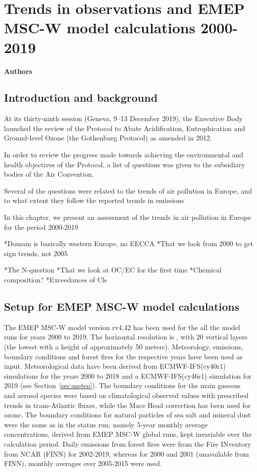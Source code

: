 \chapter[Trends]{Trends in observations and EMEP MSC-W model calculations 2000-2019}
\label{ch:Trends}

{\bf{Authors}}\\


\section{\label{sec:Trends_introduction}Introduction and background}
At its thirty-ninth session (Geneva, 9–13 December 2019), the Executive Body launched the review of the Protocol to Abate Acidification, Eutrophication and Ground-level Ozone (the Gothenburg Protocol) as amended in 2012.

In order to review the progress made towards achieving the environmental and health objectives of the Protocol, a
list of questions was given to the subsidiary bodies of the Air Convention.

Several of the questions were related to the trends of air pollution in Europe, and to what extent they follow the reported trends in emissions

In this chapter, we present an assessment of the trends in air pollution in Europe for the period 2000-2019

*Domain is basically western Europe, no EECCA
*That we look from 2000 to get sign trends, not 2005

*The N-question
*That we look at OC/EC for the first time
*Chemical composition?
*Exceedances of Cls

\section{\label{EMEPmodelcalc}{Setup for EMEP MSC-W model calculations}}
The EMEP MSC-W model version rv4.42 has been used for the all the model runs for years 2000 to 2019. The horizontal resolution is \resZO, with 20 vertical layers (the lowest with a height of approximately 50 meters).
 Meteorology, emissions, boundary conditions and forest fires for the respective years have been used as input. Meteorological data have been
 derived from ECMWF-IFS(cy40r1) simulations for the years 2000 to 2018 and a ECMWF-IFS(cy46r1) simulation for 2019 (see Section~\ref{sec:meteo}). 
 The boundary conditions for the main gaseous and aerosol species were based on climatological observed values with prescribed trends in trans-Atlantic fluxes, while the Mace
Head correction has been used for ozone. The boundary conditions for natural particles of
sea salt and mineral dust were the same as in the status run, namely 5-year monthly average
concentrations, derived from EMEP MSC-W global runs, kept invariable over the calculation
period.
Daily emissions from forest fires were from the Fire INventory from NCAR (FINN) for 2002-2019,
whereas for 2000 and 2001 (unavailable from FINN), monthly averages over 2005-2015 were
used.

